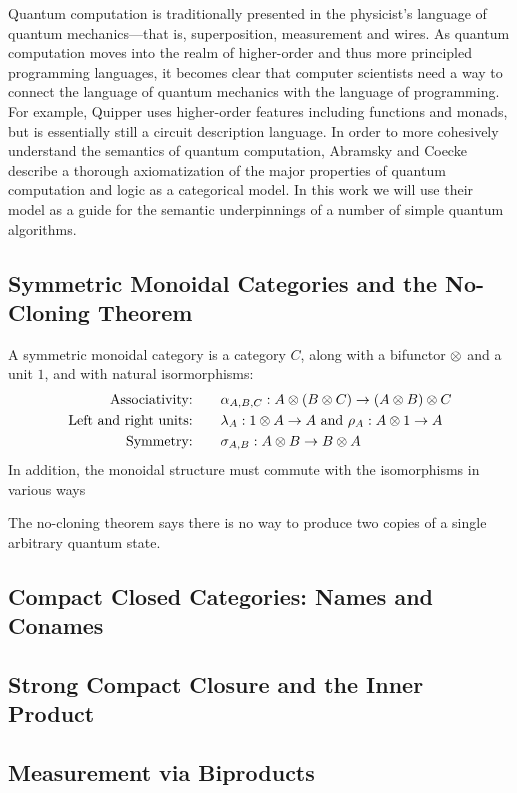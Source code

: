 
Quantum computation is traditionally presented in the physicist's language
of quantum mechanics---that is, superposition, measurement and wires. 
As quantum computation moves into the realm of higher-order and thus more principled
programming languages, it becomes clear that computer scientists need a way to 
connect the language of quantum mechanics with the language of programming. 
For example, Quipper\cite{green13quipper} uses higher-order features including
functions and monads, but is essentially still a circuit description language.
In order to more cohesively understand the semantics of quantum computation,
Abramsky and Coecke\cite{abramsky2009categorical} describe a thorough 
axiomatization of the major properties of quantum computation and logic
as a categorical model. In this work we will use their model as a guide
for the semantic underpinnings of a number of simple quantum algorithms.


\subsection{Symmetric Monoidal Categories and the No-Cloning Theorem}

A symmetric monoidal category is a category $C$, along with a bifunctor $\otimes$
and a unit $1$, and with natural isormorphisms:
\begin{align*}
    \text{Associativity:}&\qquad \alpha_{A,B,C} : A \otimes (B \otimes C) \rightarrow (A \otimes B) \otimes C \\
    \text{Left and right units:}&\qquad \lambda_A : 1 \otimes A \rightarrow A \text{ and } \rho_A : A \otimes 1 \rightarrow A \\
    \text{Symmetry:}&\qquad \sigma_{A,B} : A \otimes B \rightarrow B \otimes A \\
\end{align*}
In addition, the monoidal structure must commute with the isomorphisms in various ways 

The no-cloning theorem says there is no way to produce two copies of a single arbitrary quantum state.

\subsection{Compact Closed Categories: Names and Conames}

\subsection{Strong Compact Closure and the Inner Product}

\subsection{Measurement via Biproducts}
